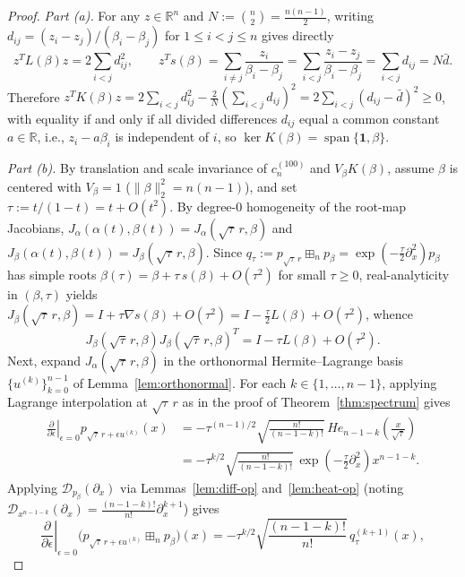 \documentclass[11pt,a4paper]{article}
\theoremstyle{definition}
\DeclareMathOperator{\Span}{span}
\newcommand{\R}{\mathbb{R}}
\newcommand{\boxplusn}{\boxplus_n}
\newcommand{\one}{\mathbf{1}}
\begin{document}
\begin{proof}
\emph{Part (a).} For any $z \in \R^n$ and $N := \binom{n}{2} = \frac{n(n-1)}{2}$, writing $d_{ij} = (z_i - z_j)/(\beta_i - \beta_j)$ for $1 \le i < j \le n$ gives directly
\[
z^T L(\beta) z = 2\sum_{i < j} d_{ij}^2, \qquad
z^T s(\beta) = \sum_{i \neq j} \frac{z_i}{\beta_i - \beta_j} = \sum_{i < j} \frac{z_i - z_j}{\beta_i - \beta_j} = \sum_{i < j} d_{ij} = N\bar{d}.
\]
Therefore $z^T K(\beta) z = 2\sum_{i<j} d_{ij}^2 - \frac{2}{N}(\sum_{i<j} d_{ij})^2 = 2\sum_{i<j}(d_{ij} - \bar{d})^2 \ge 0$, with equality if and only if all divided differences $d_{ij}$ equal a common constant $a \in \R$, i.e., $z_i - a\beta_i$ is independent of $i$, so $\ker K(\beta) = \Span\{\one, \beta\}$.

\emph{Part (b).} By translation and scale invariance of $c_n^{(100)}$ and $V_\beta K(\beta)$, assume $\beta$ is centered with $V_\beta = 1$ ($\|\beta\|_2^2 = n(n-1)$), and set $\tau := t/(1-t) = t + O(t^2)$. By degree-$0$ homogeneity of the root-map Jacobians, $J_\alpha(\alpha(t), \beta(t)) = J_\alpha(\sqrt{\tau}\,r, \beta)$ and $J_\beta(\alpha(t), \beta(t)) = J_\beta(\sqrt{\tau}\,r, \beta)$. Since $q_\tau := p_{\sqrt{\tau}\,r} \boxplusn p_\beta = \exp(-\frac{\tau}{2}\partial_x^2) p_\beta$ has simple roots $\beta(\tau) = \beta + \tau\, s(\beta) + O(\tau^2)$ for small $\tau \ge 0$, real-analyticity in $(\beta, \tau)$ yields $J_\beta(\sqrt{\tau}\,r, \beta) = I + \tau\nabla s(\beta) + O(\tau^2) = I - \frac{\tau}{2}L(\beta) + O(\tau^2)$, whence
\[
J_\beta(\sqrt{\tau}\,r, \beta) J_\beta(\sqrt{\tau}\,r, \beta)^T = I - \tau L(\beta) + O(\tau^2).
\]
Next, expand $J_\alpha(\sqrt{\tau}\,r, \beta)$ in the orthonormal Hermite--Lagrange basis $\{u^{(k)}\}_{k=0}^{n-1}$ of Lemma~\ref{lem:orthonormal}. For each $k \in \{1, \dots, n-1\}$, applying Lagrange interpolation at $\sqrt{\tau}\,r$ as in the proof of Theorem~\ref{thm:spectrum} gives
\begin{align*}
\left.\frac{\partial}{\partial \epsilon}\right|_{\epsilon=0} p_{\sqrt{\tau}\,r + \epsilon u^{(k)}}(x)
&= -\tau^{(n-1)/2} \sqrt{\frac{n!}{(n-1-k)!}}\, He_{n-1-k}\!\left(\frac{x}{\sqrt{\tau}}\right) \\
&= -\tau^{k/2}\sqrt{\frac{n!}{(n-1-k)!}}\, \exp\!\left(-\frac{\tau}{2}\partial_x^2\right) x^{n-1-k}.
\end{align*}
Applying $\mathcal{D}_{p_\beta}(\partial_x)$ via Lemmas~\ref{lem:diff-op} and~\ref{lem:heat-op} (noting $\mathcal{D}_{x^{n-1-k}}(\partial_x) = \frac{(n-1-k)!}{n!}\partial_x^{k+1}$) gives
\[
\left.\frac{\partial}{\partial \epsilon}\right|_{\epsilon=0}\bigl(p_{\sqrt{\tau}\,r + \epsilon u^{(k)}} \boxplusn p_\beta\bigr)(x) = -\tau^{k/2}\sqrt{\frac{(n-1-k)!}{n!}}\, q_\tau^{(k+1)}(x),
\]
\end{proof}
\end{document}

